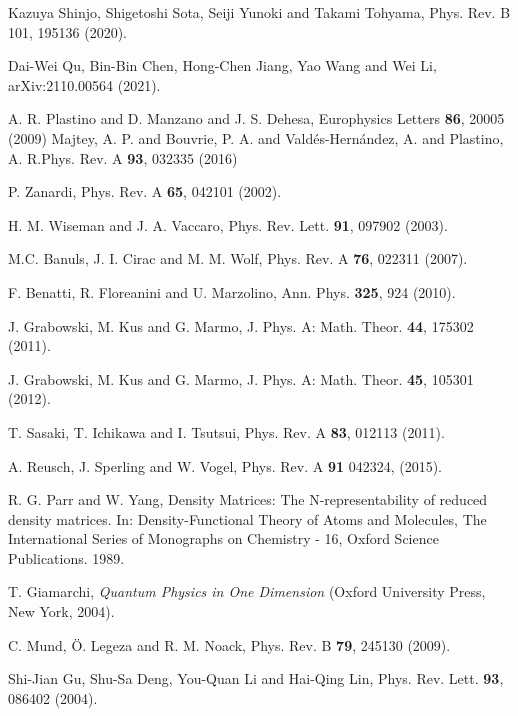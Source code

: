 \documentclass[prb,reprint,showpacs,twocolumn,superscriptaddress]{revtex4-2}
\begin{document}
\begin{thebibliography}{99}
 Kazuya Shinjo, Shigetoshi Sota, Seiji Yunoki and Takami Tohyama, Phys. Rev. B 101, 195136 (2020).

 Dai-Wei Qu, Bin-Bin Chen, Hong-Chen Jiang, Yao Wang and Wei Li, arXiv:2110.00564 (2021).


 A. R. Plastino and D. Manzano and J. S. Dehesa, 
Europhysics Letters \textbf{86}, 20005 (2009)
 Majtey, A. P. and Bouvrie, P. A. and Vald\'es-Hern\'andez, 
A. and Plastino, A. R.Phys. Rev. A \textbf{93}, 032335 (2016)

 P. Zanardi, Phys. Rev. A 
\textbf{65}, 042101 (2002).

 H. M. Wiseman and J. A. Vaccaro, Phys.
 Rev. Lett. \textbf{91}, 097902 (2003).

 M.C. Banuls, J. I. Cirac and M. M. Wolf,
Phys. Rev. A {\bf 76}, 022311 (2007).

 F. Benatti, R. Floreanini and U. Marzolino, Ann. Phys.
\textbf{325}, 924 (2010).

 J. Grabowski, M. Kus and G. Marmo,
J. Phys. A: Math. Theor. {\bf44}, 175302 (2011). 

 J. Grabowski, M. Kus and G. Marmo,
J. Phys. A: Math. Theor. {\bf 45}, 105301 (2012).

 T. Sasaki, T. Ichikawa and I. Tsutsui,
Phys. Rev. A {\bf 83}, 012113 (2011).

 A. Reusch, J. Sperling  and W. Vogel,
 Phys. Rev. A \textbf{91} 042324, (2015).
 
 R. G. Parr and W. Yang,
 Density Matrices: The N-representability of reduced
 density matrices. In: Density-Functional Theory of Atoms
 and Molecules, The International Series of Monographs
 on Chemistry - 16, Oxford Science Publications. 1989.

 T. Giamarchi, \textit{Quantum Physics in 
One Dimension} (Oxford University Press, New York, 2004).

 C. Mund, \"{O}. Legeza and R. M. Noack, Phys. Rev. B 
\textbf{79},  245130  (2009).

 Shi-Jian Gu, Shu-Sa Deng, You-Quan Li and Hai-Qing Lin, Phys. Rev. Lett.
\textbf{93}, 086402 (2004).


\end{thebibliography}
\end{document}
